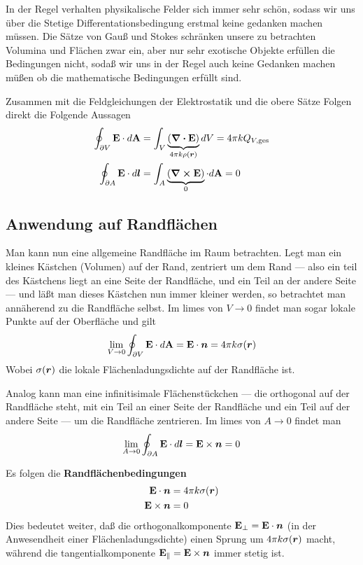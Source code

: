 In der Regel verhalten physikalische Felder sich immer sehr schön, sodass
wir uns über die Stetige Differentationsbedingung erstmal keine gedanken
machen müssen. Die Sätze von Gauß und Stokes schränken unsere zu betrachten
Volumina und Flächen zwar ein, aber nur sehr exotische Objekte erfüllen
die Bedingungen nicht, sodaß wir uns in der Regel auch keine Gedanken
machen müßen ob die mathematische Bedingungen erfüllt sind.

Zusammen mit die Feldgleichungen der Elektrostatik und die obere Sätze
Folgen direkt die Folgende Aussagen
\begin{equation}
  \begin{split}
    \oint_{\partial V} \vb E \cdot d\vb A 
    &
    =\int_V \underbrace{(\div \vb E)}_{4\pi k \rho(\vb*r)} dV
    =4\pi k Q_{V,\text{ges}}\\
    \oint_{\partial A} \vb E \cdot d\vb*l 
    &
    =\int_A \underbrace{(\curl \vb E)}_{0} \cdot d \vb A
    = 0
  \end{split}
\end{equation}

\subsection{Anwendung auf Randflächen}%
\label{ssub:anwendungen-auf-randflaechen}
Man kann nun eine allgemeine Randfläche im Raum betrachten. Legt man ein
kleines Kästchen (Volumen) auf der Rand, zentriert um dem Rand --- also ein
teil des Kästchens liegt an eine Seite der Randfläche, und ein Teil an 
der andere Seite --- und läßt man dieses Kästchen nun immer kleiner werden,
so betrachtet man annäherend zu die Randfläche selbst. Im limes von $V\to0$
findet man sogar lokale Punkte auf der Oberfläche und gilt
\begin{equation*}
  \lim_{V \to 0} \oint_{\partial V} \vb E \cdot 
  d\vb A 
  = \vb E \cdot \vb*n= 4\pi k \sigma(\vb*r)
\end{equation*}
Wobei $\sigma(\vb*r)$ die lokale Flächenladungsdichte auf der Randfläche 
ist.

Analog kann man eine infinitisimale Flächenstückchen 
--- die orthogonal auf der 
Randfläche steht, mit ein Teil an einer Seite der Randfläche und ein Teil
auf der andere Seite --- um die Randfläche zentrieren. Im limes von 
$A\to0$ findet man
\begin{equation*}
    \lim_{A \to 0} \oint_{\partial A} \vb E \cdot d\vb*l 
    = \vb E \times \vb*n
    = 0
\end{equation*}

Es folgen die \textbf{Randflächenbedingungen}
\begin{equation}
  \begin{split}
    \vb E \cdot \vb*n &= 4\pi k \sigma(\vb*r) \\
    \vb E \times \vb*n &= 0
  \end{split}
\end{equation}
Dies bedeutet weiter, daß die orthogonalkomponente 
$\vb E_{\perp}= \vb E\cdot \vb*n$ (in der Anwesendheit einer 
Flächenladungsdichte) einen Sprung um $4\pi k \sigma(\vb*r)$ macht, während
die tangentialkomponente $\vb E_{\parallel}=\vb E \times \vb*n$ immer
stetig ist.

